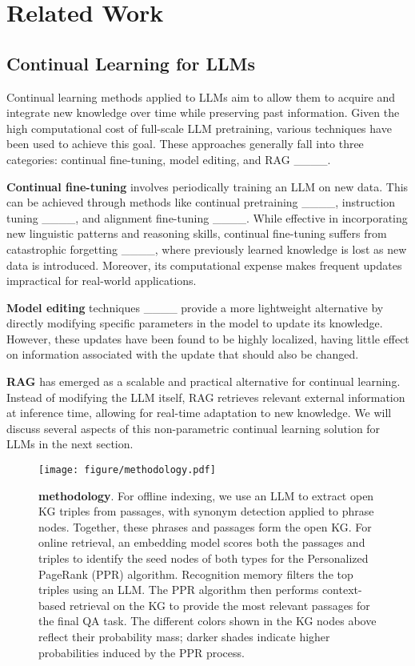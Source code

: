 \section{Related Work}
\subsection{Continual Learning for LLMs}

Continual learning methods applied to LLMs aim to allow them to acquire and integrate new knowledge over time while preserving past information. 
Given the high computational cost of full-scale LLM pretraining, various techniques have been used to achieve this goal. 
These approaches generally fall into three categories: continual fine-tuning, model editing, and RAG ____.

\textbf{Continual fine-tuning} involves periodically training an LLM on new data. This can be achieved through methods like continual pretraining ____, instruction tuning ____, and alignment fine-tuning ____. 
While effective in incorporating new linguistic patterns and reasoning skills, continual fine-tuning suffers from catastrophic forgetting ____, where previously learned knowledge is lost as new data is introduced. Moreover, its computational expense makes frequent updates impractical for real-world applications.

\textbf{Model editing} techniques ____ provide a more lightweight alternative by directly modifying specific parameters in the model to update its knowledge. However, these updates have been found to be highly localized, having little effect on information associated with the update that should also be changed.

\textbf{RAG} has emerged as a scalable and practical alternative for continual learning. Instead of modifying the LLM itself, RAG retrieves relevant external information at inference time, allowing for real-time adaptation to new knowledge. 
We will discuss several aspects of this non-parametric continual learning solution for LLMs in the next section.


\begin{figure*}
    \centering
    \texttt{[image: figure/methodology.pdf]}
      \vskip -0.1in
    \caption{\textbf{\ours methodology}.
    For offline indexing, we use an LLM to extract open KG triples from passages, with synonym detection applied to phrase nodes. Together, these phrases and passages form the open KG. 
    For online retrieval, an embedding model scores both the passages and triples to identify the seed nodes of both types for the Personalized PageRank (PPR) algorithm. Recognition memory filters the top triples using an LLM. The PPR algorithm then performs context-based retrieval on the KG to provide the most relevant passages for the final QA task. The different colors shown in the KG nodes above reflect their probability mass; darker shades indicate higher probabilities induced by the PPR process.
    }
    \label{fig:methodology}
  \vskip -0.1in
\end{figure*}

